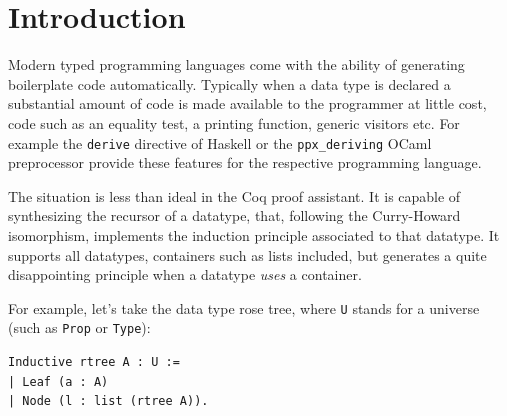 \documentclass[sigplan,10pt,review]{acmart}\settopmatter{printfolios=true,printccs=false,printacmref=false}
\begin{document}


\maketitle

\section{Introduction}

Modern typed programming languages come with the ability of generating
boilerplate code automatically. Typically when a data type is declared
a substantial amount of code is made available to the programmer at
little cost, code such as an equality test, a printing function,
generic visitors etc.  For example the \lstinline+derive+ directive of
Haskell or the
\lstinline+ppx_deriving+ OCaml preprocessor
provide these features for the respective programming language.

The situation is less than ideal in the Coq proof assistant.  It is
capable of synthesizing the recursor of a datatype, that,
following the Curry-Howard isomorphism, implements the induction
principle associated to that datatype. It supports all datatypes,
containers such as lists included, but generates a quite disappointing
principle when a datatype \emph{uses} a container.

For example, let's take the data type rose tree, where \lstinline+U+
stands for a universe (such as \lstinline+Prop+ or \lstinline+Type+):

\begin{minipage}{\textwidth}\begin{lstlisting}
Inductive rtree A : U :=
| Leaf (a : A)
| Node (l : list (rtree A)).
\end{lstlisting}\end{minipage}
\end{document}

